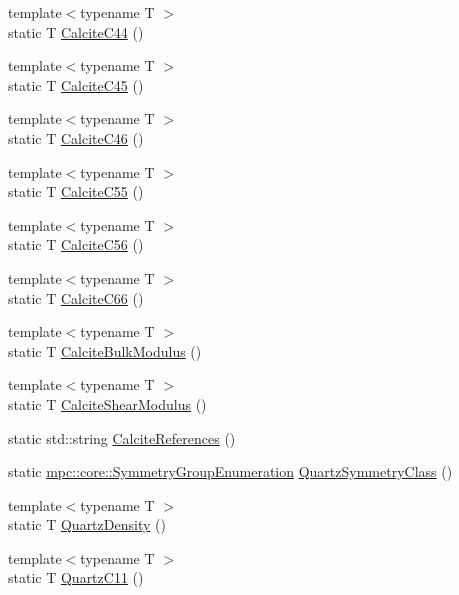 \begin{DoxyCompactItemize}
\item 
{\footnotesize template$<$typename T $>$ }\\static T \mbox{\hyperlink{namespacempc_1_1data_a0efde002d791ab3844c9784ddb682f2b}{Calcite\+C44}} ()
\item 
{\footnotesize template$<$typename T $>$ }\\static T \mbox{\hyperlink{namespacempc_1_1data_a06cc4616eb188aabbcd5733bfdeecbf1}{Calcite\+C45}} ()
\item 
{\footnotesize template$<$typename T $>$ }\\static T \mbox{\hyperlink{namespacempc_1_1data_a8fc6500ce0bc5da6ed29b754e039bbbc}{Calcite\+C46}} ()
\item 
{\footnotesize template$<$typename T $>$ }\\static T \mbox{\hyperlink{namespacempc_1_1data_ae6cfe5802e6fba0ed8f3343d82d32be0}{Calcite\+C55}} ()
\item 
{\footnotesize template$<$typename T $>$ }\\static T \mbox{\hyperlink{namespacempc_1_1data_a1670006faa5fda3c603812b4d414ff17}{Calcite\+C56}} ()
\item 
{\footnotesize template$<$typename T $>$ }\\static T \mbox{\hyperlink{namespacempc_1_1data_a5575e0cad4cf8779b1acede8e2117d06}{Calcite\+C66}} ()
\item 
{\footnotesize template$<$typename T $>$ }\\static T \mbox{\hyperlink{namespacempc_1_1data_abbbe7593f977049fa35939683b4372a5}{Calcite\+Bulk\+Modulus}} ()
\item 
{\footnotesize template$<$typename T $>$ }\\static T \mbox{\hyperlink{namespacempc_1_1data_ab8e26024b9887527fc940b07c61658bd}{Calcite\+Shear\+Modulus}} ()
\item 
static std\+::string \mbox{\hyperlink{namespacempc_1_1data_a9ec9cec996c0b8f47035d6c2f87dc5b4}{Calcite\+References}} ()
\item 
static \mbox{\hyperlink{namespacempc_1_1core_a9d979684062547055a0ef5c13077bad8}{mpc\+::core\+::\+Symmetry\+Group\+Enumeration}} \mbox{\hyperlink{namespacempc_1_1data_abf73077c104b9fed2bbc5010e426e761}{Quartz\+Symmetry\+Class}} ()
\item 
{\footnotesize template$<$typename T $>$ }\\static T \mbox{\hyperlink{namespacempc_1_1data_a80e2080ccffe158fef6e94f1aa08f469}{Quartz\+Density}} ()
\item 
{\footnotesize template$<$typename T $>$ }\\static T \mbox{\hyperlink{namespacempc_1_1data_a0adc6e4d374d5a016d5290538f19cbc4}{Quartz\+C11}} ()

\end{DoxyCompactItemize}
